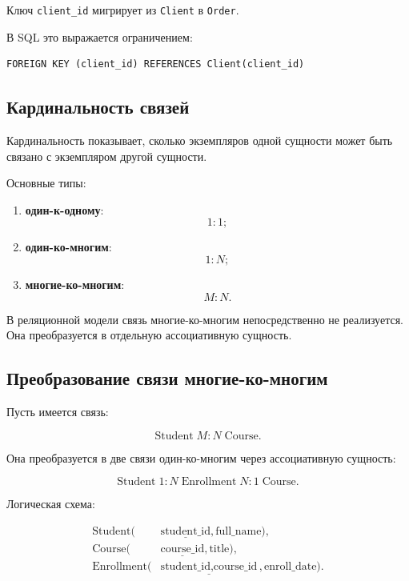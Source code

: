 \documentclass[12pt,a4paper]{article}
\theoremstyle{remark}
\begin{document}
Ключ \texttt{client\_id} мигрирует из \texttt{Client} в \texttt{Order}.

В SQL это выражается ограничением:

\begin{verbatim}
FOREIGN KEY (client_id) REFERENCES Client(client_id)
\end{verbatim}

\subsection{Кардинальность связей}

Кардинальность показывает, сколько экземпляров одной сущности может быть связано с экземпляром другой сущности.

Основные типы:

\begin{enumerate}
    \item \textbf{один-к-одному}:
    \[
        1 : 1;
    \]

    \item \textbf{один-ко-многим}:
    \[
        1 : N;
    \]

    \item \textbf{многие-ко-многим}:
    \[
        M : N.
    \]
\end{enumerate}

В реляционной модели связь многие-ко-многим непосредственно не реализуется. Она преобразуется в отдельную ассоциативную сущность.

\subsection{Преобразование связи многие-ко-многим}

Пусть имеется связь:

\[
    \text{Student} \; M : N \; \text{Course}.
\]

Она преобразуется в две связи один-ко-многим через ассоциативную сущность:

\[
    \text{Student} \; 1 : N \; \text{Enrollment} \; N : 1 \; \text{Course}.
\]

Логическая схема:

\[
\begin{aligned}
    \text{Student}(&\underline{\text{student\_id}}, \text{full\_name}),\\
    \text{Course}(&\underline{\text{course\_id}}, \text{title}),\\
    \text{Enrollment}(&\underline{\text{student\_id}, \text{course\_id}}, \text{enroll\_date}).
\end{aligned}
\]
\end{document}
